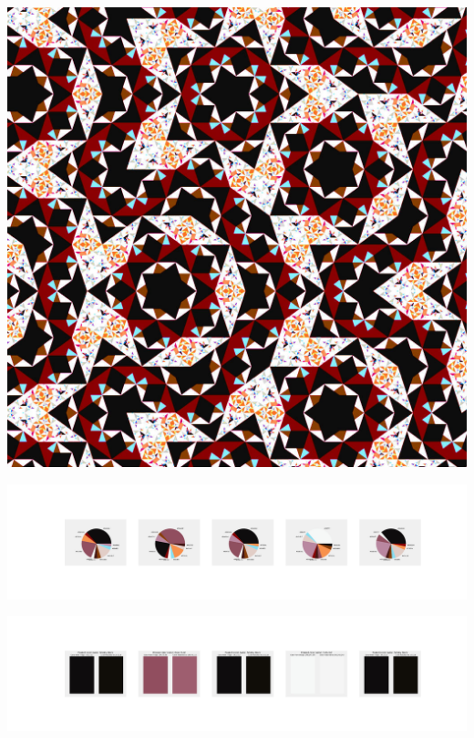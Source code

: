 \documentclass[11pt]{article}
\begin{document}
\begin{landscape}
    \begin{center}
    \includegraphics[width=\textwidth]{./nbimg/file (341).jpg}
    \end{center}

    \begin{center}
    \includegraphics[width=250mm]{./nbimg/pie-269.jpg}
    \end{center}

    \begin{center}
    \includegraphics[width=250mm]{./nbimg/peak-269.jpg}
    \end{center}
    


\end{landscape}
\end{document}
